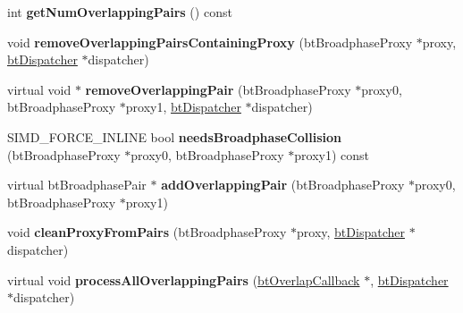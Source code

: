 \begin{DoxyCompactItemize}
\item 
\mbox{\label{classbtHashedOverlappingPairCache_ae82270949a717aa2c99920b423020459}} 
int {\bfseries get\+Num\+Overlapping\+Pairs} () const
\item 
\mbox{\label{classbtHashedOverlappingPairCache_a088ca9c8bbd67fe82bb1ac8eb867cecf}} 
void {\bfseries remove\+Overlapping\+Pairs\+Containing\+Proxy} (bt\+Broadphase\+Proxy $\ast$proxy, \hyperlink{classbtDispatcher}{bt\+Dispatcher} $\ast$dispatcher)
\item 
\mbox{\label{classbtHashedOverlappingPairCache_a175fc9fa76d7dc909624ef9417f0cdf1}} 
virtual void $\ast$ {\bfseries remove\+Overlapping\+Pair} (bt\+Broadphase\+Proxy $\ast$proxy0, bt\+Broadphase\+Proxy $\ast$proxy1, \hyperlink{classbtDispatcher}{bt\+Dispatcher} $\ast$dispatcher)
\item 
\mbox{\label{classbtHashedOverlappingPairCache_adc69b96056390f46422651560c2dabfe}} 
S\+I\+M\+D\+\_\+\+F\+O\+R\+C\+E\+\_\+\+I\+N\+L\+I\+NE bool {\bfseries needs\+Broadphase\+Collision} (bt\+Broadphase\+Proxy $\ast$proxy0, bt\+Broadphase\+Proxy $\ast$proxy1) const
\item 
\mbox{\label{classbtHashedOverlappingPairCache_a97935b649a0d10f831340d4f46cb82b6}} 
virtual bt\+Broadphase\+Pair $\ast$ {\bfseries add\+Overlapping\+Pair} (bt\+Broadphase\+Proxy $\ast$proxy0, bt\+Broadphase\+Proxy $\ast$proxy1)
\item 
\mbox{\label{classbtHashedOverlappingPairCache_a14f6d7b7b16b7d032f8a9146c337d211}} 
void {\bfseries clean\+Proxy\+From\+Pairs} (bt\+Broadphase\+Proxy $\ast$proxy, \hyperlink{classbtDispatcher}{bt\+Dispatcher} $\ast$dispatcher)
\item 
\mbox{\label{classbtHashedOverlappingPairCache_a747ff6208c5fe1e114fd7441d154ccaf}} 
virtual void {\bfseries process\+All\+Overlapping\+Pairs} (\hyperlink{structbtOverlapCallback}{bt\+Overlap\+Callback} $\ast$, \hyperlink{classbtDispatcher}{bt\+Dispatcher} $\ast$dispatcher)
\item 
\mbox{\label{classbtHashedOverlappingPairCache_a9c73398dc9892084bdb17847033f9c94}} 

\end{DoxyCompactItemize}
